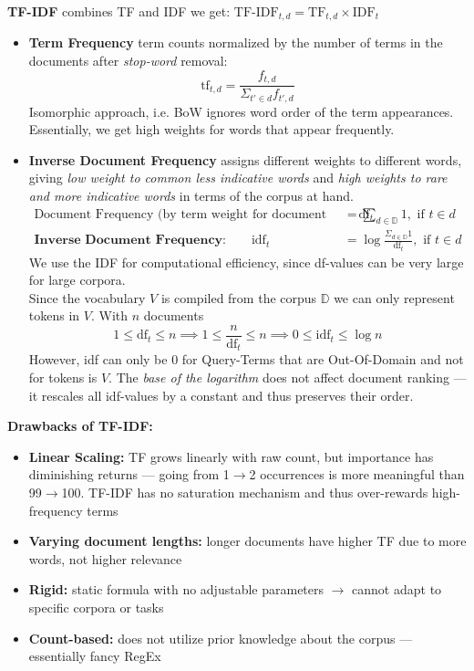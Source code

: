 \documentclass{article}
\begin{document}
\noindent\textbf{TF-IDF} combines TF and IDF we get: $\text{TF-IDF}_{t,d}= \text{TF}_{t,d} \times \text{IDF}_{t}$

\begin{itemize}
    \item \textbf{Term Frequency} term counts normalized by the number of terms in the documents after \textit{stop-word} removal: 
    $$
    \text{tf}_{t,d}=\frac{f_{t,d}}{\Sigma_{t'\in d}f_{t',d}}
    $$
    Isomorphic approach, i.e. BoW ignores word order of the term appearances. Essentially, we get high weights for words that appear frequently.
    \item \textbf{Inverse Document Frequency} assigns different weights to different words, giving \textit{low weight to common less indicative words} and \textit{high weights to rare and more indicative words} in terms of the corpus at hand.
    \begin{align*}
        \text{Document Frequency (by term weight for document appearance):}\qquad \text{df}_t &=\sum_{d\in \mathbb{D}} 1, \text{ if } t \in d \\
        \textbf{Inverse Document Frequency:} \qquad \text{idf}_t &= \log \frac{\Sigma_{d\in \mathbb{D}}1}{\text{df}_t}, \text{ if } t \in d
    \end{align*}
    We use the IDF for computational efficiency, since df-values can be very large for large corpora.\\
    Since the vocabulary $V$ is compiled from the corpus $\mathbb{D}$ we can only represent tokens in $V$. With $n$ documents 
    $$1 \leq \text{df}_t \leq n \implies 1 \leq \frac{n}{\text{df}_t} \leq n \implies 0 \leq \text{idf}_t \leq \log n$$
    However, idf can only be $0$ for Query-Terms that are Out-Of-Domain and not for tokens is $V$. The \textit{base of the logarithm} does not affect document ranking --- it rescales all idf-values by a constant and thus preserves their order.
\end{itemize}

\noindent\textbf{Drawbacks of TF-IDF:}
\begin{itemize}
    \item \textbf{Linear Scaling:} TF grows linearly with raw count, but importance has diminishing returns --- going from 1$\to$2 occurrences is more meaningful than 99$\to$100. TF-IDF has no saturation mechanism and thus over-rewards high-frequency terms
    \item \textbf{Varying document lengths:} longer documents have higher TF due to more words, not higher relevance
    \item \textbf{Rigid:} static formula with no adjustable parameters $\rightarrow$ cannot adapt to specific corpora or tasks
    \item \textbf{Count-based:} does not utilize prior knowledge about the corpus --- essentially fancy RegEx
\end{itemize}
\end{document}
